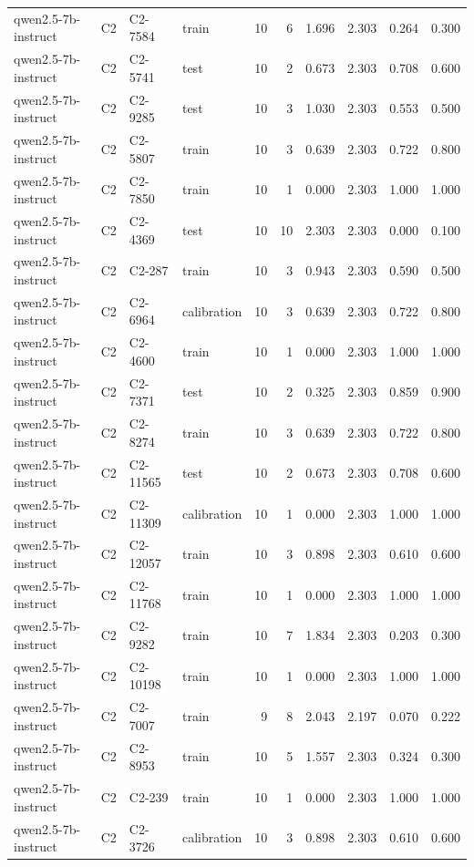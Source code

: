 \begin{table}
\begin{tabular}{llllrrrrrr}
qwen2.5-7b-instruct & C2 & C2-7584 & train & 10 & 6 & 1.696 & 2.303 & 0.264 & 0.300 \\
qwen2.5-7b-instruct & C2 & C2-5741 & test & 10 & 2 & 0.673 & 2.303 & 0.708 & 0.600 \\
qwen2.5-7b-instruct & C2 & C2-9285 & test & 10 & 3 & 1.030 & 2.303 & 0.553 & 0.500 \\
qwen2.5-7b-instruct & C2 & C2-5807 & train & 10 & 3 & 0.639 & 2.303 & 0.722 & 0.800 \\
qwen2.5-7b-instruct & C2 & C2-7850 & train & 10 & 1 & 0.000 & 2.303 & 1.000 & 1.000 \\
qwen2.5-7b-instruct & C2 & C2-4369 & test & 10 & 10 & 2.303 & 2.303 & 0.000 & 0.100 \\
qwen2.5-7b-instruct & C2 & C2-287 & train & 10 & 3 & 0.943 & 2.303 & 0.590 & 0.500 \\
qwen2.5-7b-instruct & C2 & C2-6964 & calibration & 10 & 3 & 0.639 & 2.303 & 0.722 & 0.800 \\
qwen2.5-7b-instruct & C2 & C2-4600 & train & 10 & 1 & 0.000 & 2.303 & 1.000 & 1.000 \\
qwen2.5-7b-instruct & C2 & C2-7371 & test & 10 & 2 & 0.325 & 2.303 & 0.859 & 0.900 \\
qwen2.5-7b-instruct & C2 & C2-8274 & train & 10 & 3 & 0.639 & 2.303 & 0.722 & 0.800 \\
qwen2.5-7b-instruct & C2 & C2-11565 & test & 10 & 2 & 0.673 & 2.303 & 0.708 & 0.600 \\
qwen2.5-7b-instruct & C2 & C2-11309 & calibration & 10 & 1 & 0.000 & 2.303 & 1.000 & 1.000 \\
qwen2.5-7b-instruct & C2 & C2-12057 & train & 10 & 3 & 0.898 & 2.303 & 0.610 & 0.600 \\
qwen2.5-7b-instruct & C2 & C2-11768 & train & 10 & 1 & 0.000 & 2.303 & 1.000 & 1.000 \\
qwen2.5-7b-instruct & C2 & C2-9282 & train & 10 & 7 & 1.834 & 2.303 & 0.203 & 0.300 \\
qwen2.5-7b-instruct & C2 & C2-10198 & train & 10 & 1 & 0.000 & 2.303 & 1.000 & 1.000 \\
qwen2.5-7b-instruct & C2 & C2-7007 & train & 9 & 8 & 2.043 & 2.197 & 0.070 & 0.222 \\
qwen2.5-7b-instruct & C2 & C2-8953 & train & 10 & 5 & 1.557 & 2.303 & 0.324 & 0.300 \\
qwen2.5-7b-instruct & C2 & C2-239 & train & 10 & 1 & 0.000 & 2.303 & 1.000 & 1.000 \\
qwen2.5-7b-instruct & C2 & C2-3726 & calibration & 10 & 3 & 0.898 & 2.303 & 0.610 & 0.600 \\

\end{tabular}
\end{table}
